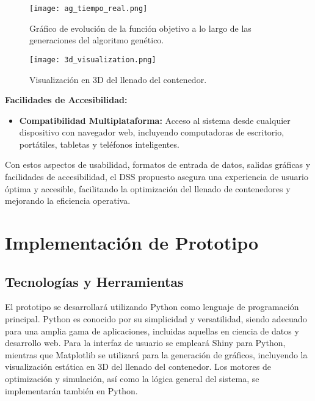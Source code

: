 \documentclass[9pt,a4paper]{rho}
\begin{document}
\begin{figure}[h!]
    \centering
    \texttt{[image: ag\_tiempo\_real.png]}
    \caption{Gráfico de evolución de la función objetivo a lo largo de las generaciones del algoritmo genético.}
    \label{fig:ag_tiempo_real}
\end{figure}

\begin{figure}[h!]
    \centering
    \texttt{[image: 3d\_visualization.png]}
    \caption{Visualización en 3D del llenado del contenedor.}
    \label{fig:3d_visualization}
\end{figure}

\textbf{Facilidades de Accesibilidad:}
\begin{itemize}
    \item \textbf{Compatibilidad Multiplataforma:} Acceso al sistema desde cualquier dispositivo con navegador web, incluyendo computadoras de escritorio, portátiles, tabletas y teléfonos inteligentes.
\end{itemize}

Con estos aspectos de usabilidad, formatos de entrada de datos, salidas gráficas y facilidades de accesibilidad, el DSS propuesto asegura una experiencia de usuario óptima y accesible, facilitando la optimización del llenado de contenedores y mejorando la eficiencia operativa.

\section{Implementación de Prototipo}

\subsection{Tecnologías y Herramientas}
El prototipo se desarrollará utilizando Python \cite{python-wikipedia} como lenguaje de programación principal. Python es conocido por su simplicidad y versatilidad, siendo adecuado para una amplia gama de aplicaciones, incluidas aquellas en ciencia de datos y desarrollo web. Para la interfaz de usuario se empleará Shiny para Python, mientras que Matplotlib \cite{matplotlib-intro} se utilizará para la generación de gráficos, incluyendo la visualización estática en 3D del llenado del contenedor. Los motores de optimización y simulación, así como la lógica general del sistema, se implementarán también en Python.
\end{document}
